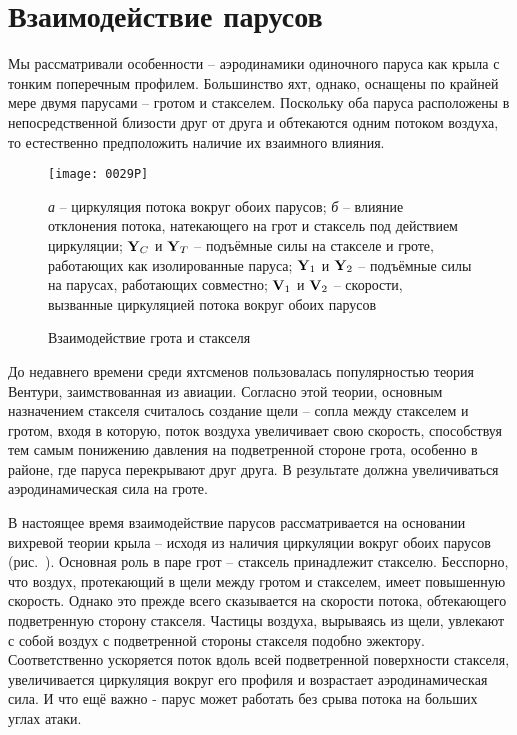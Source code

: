\section{Взаимодействие парусов}

Мы рассматривали особенности \--- аэродинамики одиночного паруса как крыла с тонким поперечным профилем. Большинство яхт, однако, оснащены по крайней мере двумя парусами \--- гротом и стакселем. Поскольку оба паруса расположены в непосредственной близости друг от друга и обтекаются одним потоком воздуха, то естественно предположить наличие их взаимного влияния. 

\begin{figure}[htb]
  \centering
  \texttt{[image: 0029P]}
  \caption{Взаимодействие грота и стакселя}
  \label{fig:29}
  \small
  \centering{}
  \textit{а} \--- циркуляция потока вокруг обоих парусов; \textit{б} \--- влияние отклонения потока, натекающего на грот и стаксель под действием циркуляции; $\mathbf{Y}_C$ и $\mathbf{Y}_T$ \--- подъёмные силы на стакселе и гроте, работающих как изолированные паруса; $\mathbf{Y}_1$ и $\mathbf{Y}_2$ \--- подъёмные силы на парусах, работающих совместно; $\mathbf{V}_1$ и $\mathbf{V}_2$ \--- скорости, вызванные циркуляцией потока вокруг обоих парусов
\end{figure}

До недавнего времени среди яхтсменов пользовалась популярностью теория Вентури, заимствованная из авиации. Согласно этой теории, основным назначением стакселя считалось создание щели \--- сопла между стакселем и гротом, входя в которую, поток воздуха увеличивает свою скорость, способствуя тем самым понижению давления на подветренной стороне грота, особенно в районе, где паруса перекрывают друг друга. В результате должна увеличиваться аэродинамическая сила на гроте.

В настоящее время взаимодействие парусов рассматривается на основании вихревой теории крыла \--- исходя из наличия циркуляции вокруг обоих парусов (рис.~). Основная роль в паре грот \--- стаксель принадлежит стакселю. Бесспорно, что воздух, протекающий в щели между гротом и стакселем, имеет повышенную скорость. Однако это прежде всего сказывается на скорости потока, обтекающего подветренную сторону стакселя. Частицы воздуха, вырываясь из щели, увлекают с собой воздух с подветренной стороны стакселя подобно эжектору. Соответственно ускоряется поток вдоль всей подветренной поверхности стакселя, увеличивается циркуляция вокруг его профиля и возрастает аэродинамическая сила. И что ещё важно - парус может работать без срыва потока на больших углах атаки.
 
